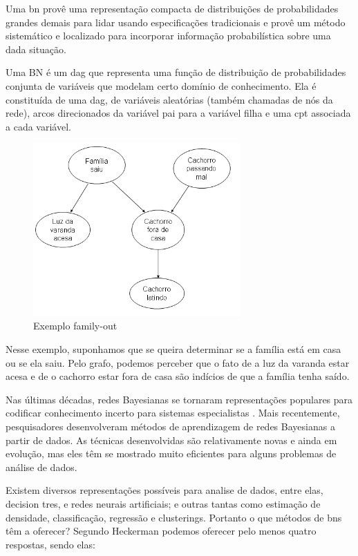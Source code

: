 
Uma \gls{bn} provê uma representação compacta de distribuições de probabilidades grandes demais para lidar usando especificações tradicionais e provê um método sistemático e localizado para incorporar informação probabilística sobre uma dada situação.

Uma BN é um \gls{dag} que representa uma função de distribuição de probabilidades conjunta de variáveis que modelam certo domínio de conhecimento. Ela é constituída de uma \gls{dag}, de variáveis aleatórias (também chamadas de nós da rede), arcos direcionados da variável pai para a variável filha e uma \gls{cpt} associada a cada variável.
\begin{figure}[H]
	\centering
	\includegraphics[width = 300px]{figuras/BN1}
	\caption[Exemplo family-out]{Exemplo family-out}
	\label{fig:familyBN}
\end{figure}

Nesse exemplo, suponhamos que se queira determinar se a família está em casa ou se ela saiu. Pelo grafo, podemos perceber que o fato de a luz da varanda estar acesa e de o cachorro estar fora de casa são indícios de que a família tenha saído. 

Nas últimas décadas, redes Bayesianas se tornaram representações populares para codificar conhecimento incerto para sistemas especialistas \cite{heck95}. Mais recentemente, pesquisadores desenvolveram métodos de aprendizagem de redes Bayesianas a partir de dados. As técnicas desenvolvidas são relativamente novas e ainda em evolução, mas eles têm se mostrado muito eficientes para alguns problemas de análise de dados.

Existem diversos representações possíveis para analise de dados, entre elas, decision tres, e redes neurais artificiais; e outras tantas como estimação de densidade, classificação, regressão e clusterings. Portanto o que métodos de \glspl{bn} têm a oferecer? Segundo Heckerman \cite{heck95} podemos oferecer pelo menos quatro respostas, sendo elas:

